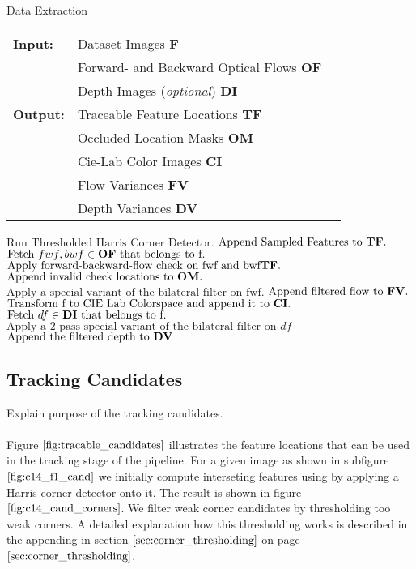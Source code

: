 \begin{algorithm}[H]
\caption{Data Extraction}
\begin{table}[H]
  \begin{tabular}{@{}lll@{}}
    \textbf{Input:} & Dataset Images \bf{F} \\
		& Forward- and Backward Optical Flows \bf{OF} \\
 		& Depth Images (\emph{optional}) \bf{DI} \\
    \textbf{Output:} & Traceable Feature Locations \bf{TF} \\
    & Occluded Location Masks \bf{OM}\\
    & Cie-Lab Color Images \bf{CI} \\
    & Flow Variances \bf{FV} \\
    & Depth Variances \bf{DV} \\
    
  \end{tabular} 
\end{table}
\setlength{\fboxrule}{0pt} 
\begin{boxedminipage}{1.0\textwidth}
  \begin{algorithmic}[1]
        \State $\text{Run Thresholded Harris Corner Detector}.$
		\State $\text{Append Sampled Features to } \bf{TF}.$
		\State $\text{Fetch } fwf,bwf \in \bf{OF} \text{ that belongs to f}.$
		\State $\text{Apply forward-backward-flow check on fwf and bwf} \bf{TF}.$
		\State $\text{Append invalid check locations to } \bf{OM}.$
		\State $\text{Apply a special variant of the bilateral filter on fwf}.$
		\State $\text{Append filtered flow to } \bf{FV}.$
		\State $\text{Transform f to CIE Lab Colorspace and append it to } \bf{CI}.$
		\State $\text{Fetch } df \in \bf{DI} \text{ that belongs to f}.$
		\State $\text{Apply a 2-pass special variant of the bilateral filter on } df$
		\State $\text{Append the filtered depth to } \bf{DV}$
      \EndFor
  \end{algorithmic}
  \end{boxedminipage}
  \vskip1.5pt
\label{alg:data_extraction}
\end{algorithm}

\subsection{Tracking Candidates}
Explain purpose of the tracking candidates. \\ \\
Figure $\ref{fig:tracable_candidates}$ illustrates the feature locations that can be used in the tracking stage of the pipeline. For a given image as shown in subfigure $\ref{fig:c14_f1_cand}$ we initially compute interseting features using by applying a Harris corner detector onto it. The result is shown in figure $\ref{fig:c14_cand_corners}$. We filter weak corner candidates by thresholding too weak corners. A detailed explanation how this thresholding works is described in the appending in section $\ref{sec:corner_thresholding}$ on page $\pageref{sec:corner_thresholding}$.


